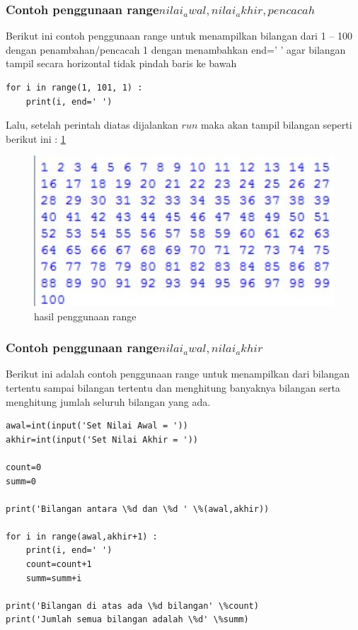 \subsubsection{Contoh penggunaan range\(nilai_awal,nilai_akhir,pencacah\)}
Berikut ini contoh penggunaan range untuk menampilkan bilangan dari 1 – 100 dengan penambahan/pencacah 1 dengan menambahkan end=’ ’ agar bilangan tampil secara horizontal tidak pindah baris ke bawah
\begin{verbatim}
for i in range(1, 101, 1) :
    print(i, end=' ')
\end{verbatim}
Lalu, setelah perintah diatas dijalankan \(run\) maka akan tampil bilangan seperti berikut ini :
\ref{2range}

\begin{figure}[ht]
    \centerline{\includegraphics[width=1\textwidth]{figures/2range.JPG}}
    \caption{hasil penggunaan range}
    \label{2range}
    \end{figure}
    
\subsubsection{Contoh penggunaan range\(nilai_awal,nilai_akhir\)}
Berikut ini adalah contoh penggunaan range untuk menampilkan dari bilangan tertentu sampai bilangan tertentu dan menghitung banyaknya bilangan serta menghitung jumlah seluruh bilangan yang ada.
\begin{verbatim}
awal=int(input('Set Nilai Awal = '))
akhir=int(input('Set Nilai Akhir = '))

count=0
summ=0

print('Bilangan antara \%d dan \%d ' \%(awal,akhir))

for i in range(awal,akhir+1) :
	print(i, end=' ')
	count=count+1
	summ=summ+i

print('Bilangan di atas ada \%d bilangan' \%count)
print('Jumlah semua bilangan adalah \%d' \%summ)
\end{verbatim}

